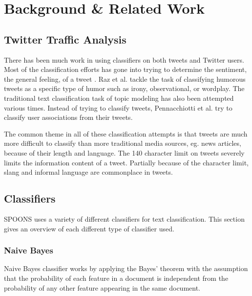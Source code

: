 \documentclass[12pt]{ucthesis}
\begin{document}
\chapter{Background \& Related Work}
\label{background-related-work}


\section{Twitter Traffic Analysis}
\label{background-classification}
There has been much work in using classifiers on both tweets and Twitter users.
Most of the classification efforts has gone into trying to determine the sentiment,
the general feeling, of a tweet \cite{Jiang}\cite{Mukherjee}\cite{Saif}\cite{Wang}.
Raz et al. tackle the task of classifying humorous tweets as a specific type of humor
such as irony, observational, or wordplay\cite{Raz}.
The traditional text classification task of topic modeling has also been attempted various times\cite{hong}\cite{Zhao}.
Instead of trying to classify tweets, Pennacchiotti et al. try to classify user associations from
their tweets\cite{Pennacchiotti}.

The common theme in all of these classification attempts is that tweets are much more difficult to
classify than more traditional media sources, eg. news articles, because of their length and language.
The 140 character limit on tweets severely limits the information content of a tweet.
Partially because of the character limit, slang and informal language are commonplace in tweets.

\section{Classifiers}
\label{background-classification-classifiers}
SPOONS uses a variety of different classifiers for text classification.
This section gives an overview of each different type of classifier used.

\subsection{Naive Bayes}
\label{background-classification-classifiers-naive-bayes}
Naive Bayes classifier works by applying the Bayes' theorem with the assumption that
the probability of each feature in a document is independent from the probability of
any other feature appearing in the same document.\cite{Kibriya}\cite{Frank}
\end{document}
